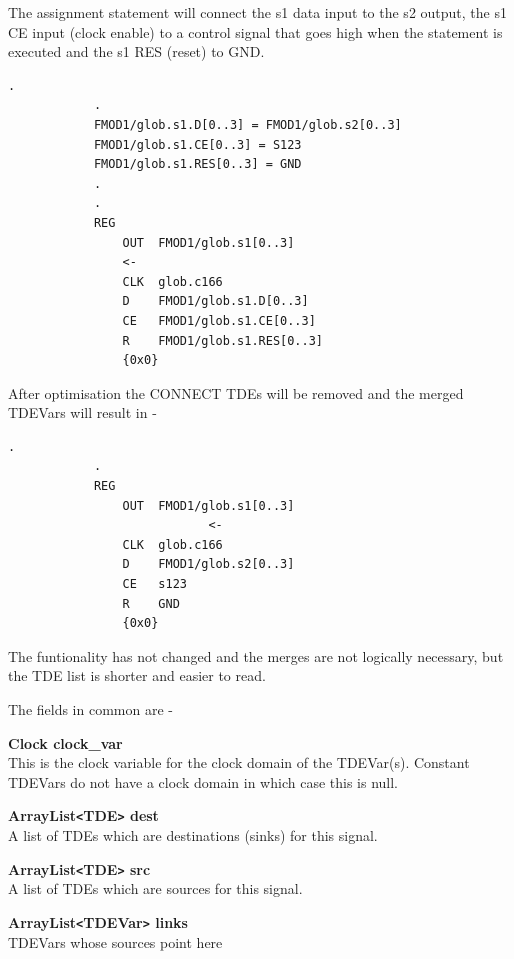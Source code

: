             The assignment statement will connect the s1 data input to the
            s2 output, the s1 CE input (clock enable) to a control signal that goes high
            when the statement is executed and the s1 RES (reset) to GND.
            
            \begin{lstlisting}[gobble=12, language=tde]
            .
            .
            FMOD1/glob.s1.D[0..3] = FMOD1/glob.s2[0..3]
            FMOD1/glob.s1.CE[0..3] = S123
            FMOD1/glob.s1.RES[0..3] = GND
            .
            .
            REG
	            OUT  FMOD1/glob.s1[0..3]
	            <-
	            CLK  glob.c166
	            D    FMOD1/glob.s1.D[0..3]
	            CE   FMOD1/glob.s1.CE[0..3]
	            R    FMOD1/glob.s1.RES[0..3]
                {0x0}
            \end{lstlisting}
            
            After optimisation the CONNECT TDEs will be removed and the merged
            TDEVars will result in -
            
            \begin{lstlisting}[gobble=12, language=tde]
            .
            .
            REG
	            OUT  FMOD1/glob.s1[0..3]
	                        <-
	            CLK  glob.c166
	            D    FMOD1/glob.s2[0..3]
	            CE   s123
	            R    GND
                {0x0}
            \end{lstlisting}
            
            The funtionality has not changed and the merges are not logically
            necessary, but the TDE list is shorter and easier to read.

            The fields in common are -
            \blist
            \item   {\bf Clock clock\_var} \\
                    This is the clock variable for the clock domain of the
                    TDEVar(s). Constant TDEVars do not have a clock domain in
                    which case this is null.
            \item   {\bf ArrayList\verb'<'TDE\verb'>' dest} \\
                    A list of TDEs which are destinations (sinks) for this signal.
            \item   {\bf ArrayList\verb'<'TDE\verb'>' src} \\
                    A list of TDEs which are sources for this signal.
            \item   {\bf ArrayList\verb'<'TDEVar\verb'>' links} \\
                    TDEVars whose sources point here
            \blend

